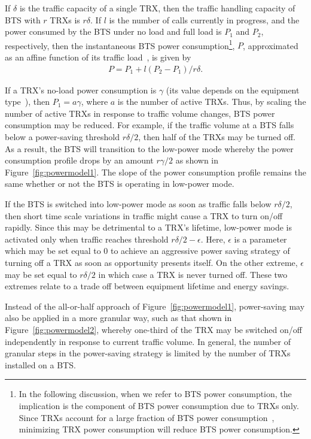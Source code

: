 If $\delta$ is the traffic capacity of a single TRX, then the traffic handling capacity of BTS with $r$ TRXs is $r\delta$. If $l$ is the number of calls currently in progress, and the power consumed by the BTS under no load and full load is $P_1$ and $P_2$, respectively, then the instantaneous BTS power consumption\footnote{In the following discussion, when we refer to BTS power consumption, the implication is the component of BTS power consumption due to TRXs only. Since TRXs account for a large fraction of BTS power consumption~\cite{Lorincz:BTS-Measure:Sensors:2012}, minimizing TRX power consumption will reduce BTS power consumption.}, $P$, approximated as an affine function of its traffic load~\cite{Peng:2011:BTSSaving:Mobicom}, is given by
\begin{align}
P = P_1 + l(P_2-P_1)/r\delta.
\end{align}

If a TRX's no-load power consumption is $\gamma$ (its value depends on the equipment type~\cite{Lorincz:BTS-Measure:Sensors:2012,flexibsc}), then $P_1=a\gamma$, where $a$ is the number of active TRXs.
Thus, by scaling the number of active TRXs in response to traffic volume changes, BTS power consumption may be reduced.
For example, if the traffic volume at a BTS falls below a power-saving threshold $r\delta/2$, then half of the TRXs may be turned off.
As a result, the BTS will transition to the low-power mode whereby the power consumption profile drops by an amount $r\gamma/2$ as shown in Figure~\ref{fig:powermodel1}. The slope of the power consumption profile remains the same whether or not the BTS is operating in low-power mode. 

If the BTS is switched into low-power mode as soon as traffic falls below $r\delta/2$, then short time scale variations in traffic might cause a TRX to turn on/off rapidly. Since this may be detrimental to a TRX's lifetime, low-power mode is activated only when traffic reaches threshold $r\delta/2-\epsilon$. Here, $\epsilon$ is a parameter which may be set equal to 0 to achieve an aggressive power saving strategy of turning off a TRX as soon as opportunity presents itself. On the other extreme, $\epsilon$ may be set equal to $r\delta/2$ in which case a TRX is never turned off. These two extremes relate to a trade
off between equipment lifetime and energy savings.

Instead of the all-or-half approach of Figure~\ref{fig:powermodel1}, power-saving may also be applied in a more granular way, such as that shown in Figure~\ref{fig:powermodel2}, whereby one-third of the TRX may be switched on/off independently in response to current traffic volume. In general, the number of granular steps in the power-saving strategy is limited by the number of TRXs installed on a BTS.

